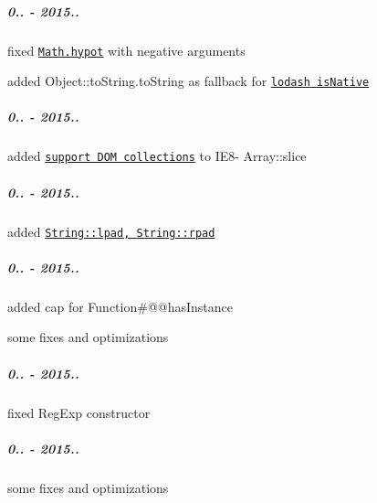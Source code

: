 \subparagraph*{0.. -\/ 2015..}


\begin{DoxyItemize}
\item fixed \href{https://github.com/zloirock/core-js/#ecmascript-6-math}{\tt {\ttfamily Math.\+hypot}} with negative arguments
\item added {\ttfamily Object\+::to\+String.\+to\+String} as fallback for \href{https://github.com/lodash/lodash/issues/1197}{\tt {\ttfamily lodash} {\ttfamily is\+Native}}
\end{DoxyItemize}

\subparagraph*{0.. -\/ 2015..}


\begin{DoxyItemize}
\item added \href{https://developer.mozilla.org/en-US/docs/Web/JavaScript/Reference/Global_Objects/Array/slice#Streamlining_cross-browser_behavior}{\tt support D\+OM collections} to I\+E8-\/ {\ttfamily Array\+::slice}
\end{DoxyItemize}

\subparagraph*{0.. -\/ 2015..}


\begin{DoxyItemize}
\item added \href{https://github.com/zloirock/core-js/#ecmascript-7}{\tt {\ttfamily String\+::lpad}, {\ttfamily String\+::rpad}}
\end{DoxyItemize}

\subparagraph*{0.. -\/ 2015..}


\begin{DoxyItemize}
\item added cap for {\ttfamily Function\#@@has\+Instance}
\item some fixes and optimizations
\end{DoxyItemize}

\subparagraph*{0.. -\/ 2015..}


\begin{DoxyItemize}
\item fixed {\ttfamily Reg\+Exp} constructor
\end{DoxyItemize}

\subparagraph*{0.. -\/ 2015..}


\begin{DoxyItemize}
\item some fixes and optimizations
\end{DoxyItemize}

